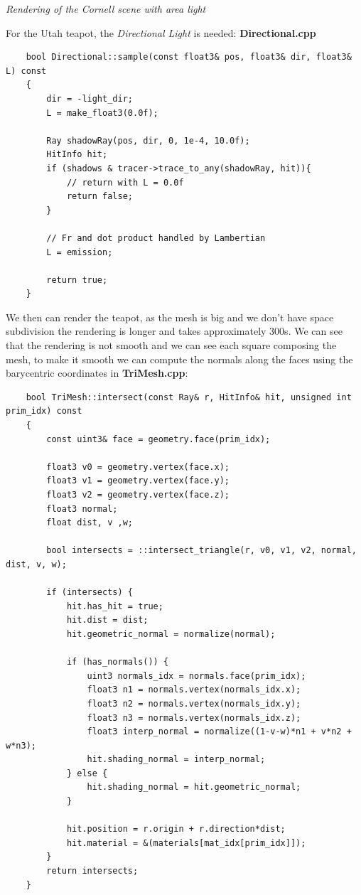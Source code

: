 \documentclass[a4,12pt]{article}
\begin{document}
\begin{center}
\begin{minipage}[b]{0.40\linewidth}
\begin{center}
				\textit{Rendering of the Cornell scene with area light}
			\end{center}
		\end{minipage}
	\end{center}
	
	For the Utah teapot, the \textit{Directional Light} is needed:
	\textbf{Directional.cpp}
	
	\begin{lstlisting}
	bool Directional::sample(const float3& pos, float3& dir, float3& L) const
	{
		dir = -light_dir;
		L = make_float3(0.0f);
		
		Ray shadowRay(pos, dir, 0, 1e-4, 10.0f);
		HitInfo hit;
		if (shadows & tracer->trace_to_any(shadowRay, hit)){
			// return with L = 0.0f
			return false;
		}
		
		// Fr and dot product handled by Lambertian
		L = emission;
		
		return true;
	}
	\end{lstlisting}
	
	We then can render the teapot, as the mesh is big and we don't have space subdivision the rendering is longer and takes approximately 300s. We can see that the rendering is not smooth and we can see each square composing the mesh, to make it smooth we can compute the normals along the faces using the barycentric coordinates in \textbf{TriMesh.cpp}:
	
	\begin{lstlisting}
	bool TriMesh::intersect(const Ray& r, HitInfo& hit, unsigned int prim_idx) const
	{
		const uint3& face = geometry.face(prim_idx);
		
		float3 v0 = geometry.vertex(face.x);
		float3 v1 = geometry.vertex(face.y);
		float3 v2 = geometry.vertex(face.z);
		float3 normal;
		float dist, v ,w;
		
		bool intersects = ::intersect_triangle(r, v0, v1, v2, normal, dist, v, w);
		
		if (intersects) {
			hit.has_hit = true;
			hit.dist = dist;
			hit.geometric_normal = normalize(normal);
			
			if (has_normals()) {
				uint3 normals_idx = normals.face(prim_idx);
				float3 n1 = normals.vertex(normals_idx.x);
				float3 n2 = normals.vertex(normals_idx.y);
				float3 n3 = normals.vertex(normals_idx.z);
				float3 interp_normal = normalize((1-v-w)*n1 + v*n2 + w*n3);
				hit.shading_normal = interp_normal;
			} else {
				hit.shading_normal = hit.geometric_normal;
			}
			
			hit.position = r.origin + r.direction*dist;
			hit.material = &(materials[mat_idx[prim_idx]]);
		}
		return intersects;
	}
	\end{lstlisting}
	
\end{document}

